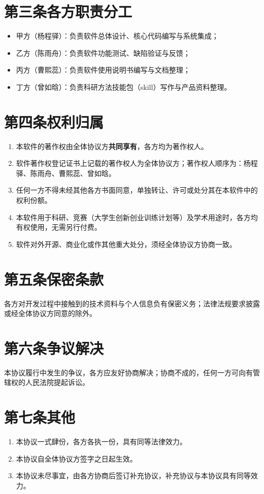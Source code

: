\documentclass[zihao=-4,a4paper,fontset=none]{ctexart}
\begin{document}
\section*{第三条\quad 各方职责分工}
\begin{itemize}[itemsep=4pt]
  \item 甲方（杨程驿）：负责软件总体设计、核心代码编写与系统集成；
  \item 乙方（陈雨舟）：负责软件功能测试、缺陷验证与反馈；
  \item 丙方（曹熙蕊）：负责软件使用说明书编写与文档整理；
  \item 丁方（曾如晗）：负责科研方法技能包（skill）写作与产品资料整理。
\end{itemize}

\section*{第四条\quad 权利归属}
\begin{enumerate}[itemsep=4pt]
  \item 本软件的著作权由全体协议方\textbf{共同享有}，各方均为著作权人。
  \item 软件著作权登记证书上记载的著作权人为全体协议方；著作权人顺序为：杨程驿、陈雨舟、曹熙蕊、曾如晗。
  \item 任何一方不得未经其他各方书面同意，单独转让、许可或处分其在本软件中的权利份额。
  \item 本软件用于科研、竞赛（大学生创新创业训练计划等）及学术用途时，各方均有权使用，无需另行付费。
  \item 软件对外开源、商业化或作其他重大处分，须经全体协议方协商一致。
\end{enumerate}

\section*{第五条\quad 保密条款}
各方对开发过程中接触到的技术资料与个人信息负有保密义务；法律法规要求披露或经全体协议方同意的除外。

\section*{第六条\quad 争议解决}
本协议履行中发生的争议，各方应友好协商解决；协商不成的，任何一方可向有管辖权的人民法院提起诉讼。

\section*{第七条\quad 其他}
\begin{enumerate}[itemsep=4pt]
  \item 本协议一式肆份，各方各执一份，具有同等法律效力。
  \item 本协议自全体协议方签字之日起生效。
  \item 本协议未尽事宜，由各方协商后签订补充协议，补充协议与本协议具有同等效力。
\end{enumerate}
\end{document}
